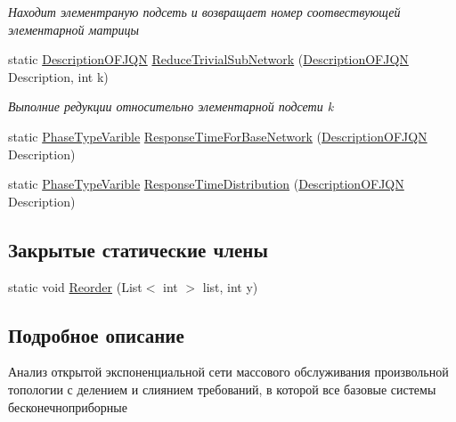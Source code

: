\begin{DoxyCompactItemize}
\begin{DoxyCompactList}\small\item\em Находит элементраную подсеть и возвращает номер соотвествующей элементарной матрицы \end{DoxyCompactList}\item 
static \hyperlink{class_network_descriptions_1_1_description_o_f_j_q_n}{Description\+O\+F\+J\+QN} \hyperlink{class_exact_network_analysis_1_1_infinity_server_open_fork_join_analizator_af1e56486f7040dafe910613157eea459}{Reduce\+Trivial\+Sub\+Network} (\hyperlink{class_network_descriptions_1_1_description_o_f_j_q_n}{Description\+O\+F\+J\+QN} Description, int k)
\begin{DoxyCompactList}\small\item\em Выполние редукции относительно элементарной подсети k \end{DoxyCompactList}\item 
static \hyperlink{class_phase_type_distribution_1_1_phase_type_varible}{Phase\+Type\+Varible} \hyperlink{class_exact_network_analysis_1_1_infinity_server_open_fork_join_analizator_ad97f666f7135599a6862ad3ef16f8973}{Response\+Time\+For\+Base\+Network} (\hyperlink{class_network_descriptions_1_1_description_o_f_j_q_n}{Description\+O\+F\+J\+QN} Description)
\item 
static \hyperlink{class_phase_type_distribution_1_1_phase_type_varible}{Phase\+Type\+Varible} \hyperlink{class_exact_network_analysis_1_1_infinity_server_open_fork_join_analizator_a4b7ce8b06e8eabf86de585c8119b9d59}{Response\+Time\+Distribution} (\hyperlink{class_network_descriptions_1_1_description_o_f_j_q_n}{Description\+O\+F\+J\+QN} Description)
\end{DoxyCompactItemize}
\subsection*{Закрытые статические члены}
\begin{DoxyCompactItemize}
\item 
static void \hyperlink{class_exact_network_analysis_1_1_infinity_server_open_fork_join_analizator_ac1e0bbf8c9137256c8895c3776dc6416}{Reorder} (List$<$ int $>$ list, int y)
\end{DoxyCompactItemize}


\subsection{Подробное описание}


Анализ открытой экспоненциальной сети массового обслуживания произвольной топологии с делением и слиянием требований, в которой все базовые системы бесконечноприборные 

